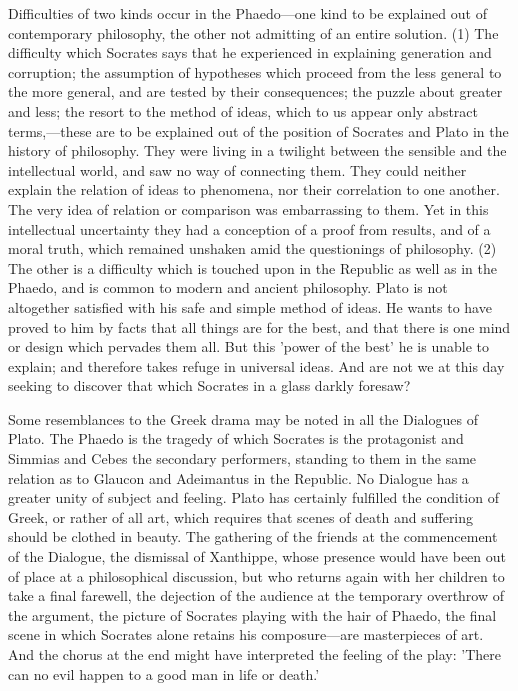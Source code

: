 \documentclass[11pt,letter]{article}
\begin{document}
\par  Difficulties of two kinds occur in the Phaedo—one kind to be explained out of contemporary philosophy, the other not admitting of an entire solution. (1) The difficulty which Socrates says that he experienced in explaining generation and corruption; the assumption of hypotheses which proceed from the less general to the more general, and are tested by their consequences; the puzzle about greater and less; the resort to the method of ideas, which to us appear only abstract terms,—these are to be explained out of the position of Socrates and Plato in the history of philosophy. They were living in a twilight between the sensible and the intellectual world, and saw no way of connecting them. They could neither explain the relation of ideas to phenomena, nor their correlation to one another. The very idea of relation or comparison was embarrassing to them. Yet in this intellectual uncertainty they had a conception of a proof from results, and of a moral truth, which remained unshaken amid the questionings of philosophy. (2) The other is a difficulty which is touched upon in the Republic as well as in the Phaedo, and is common to modern and ancient philosophy. Plato is not altogether satisfied with his safe and simple method of ideas. He wants to have proved to him by facts that all things are for the best, and that there is one mind or design which pervades them all. But this 'power of the best' he is unable to explain; and therefore takes refuge in universal ideas. And are not we at this day seeking to discover that which Socrates in a glass darkly foresaw?

\par  Some resemblances to the Greek drama may be noted in all the Dialogues of Plato. The Phaedo is the tragedy of which Socrates is the protagonist and Simmias and Cebes the secondary performers, standing to them in the same relation as to Glaucon and Adeimantus in the Republic. No Dialogue has a greater unity of subject and feeling. Plato has certainly fulfilled the condition of Greek, or rather of all art, which requires that scenes of death and suffering should be clothed in beauty. The gathering of the friends at the commencement of the Dialogue, the dismissal of Xanthippe, whose presence would have been out of place at a philosophical discussion, but who returns again with her children to take a final farewell, the dejection of the audience at the temporary overthrow of the argument, the picture of Socrates playing with the hair of Phaedo, the final scene in which Socrates alone retains his composure—are masterpieces of art. And the chorus at the end might have interpreted the feeling of the play: 'There can no evil happen to a good man in life or death.'
\end{document}
